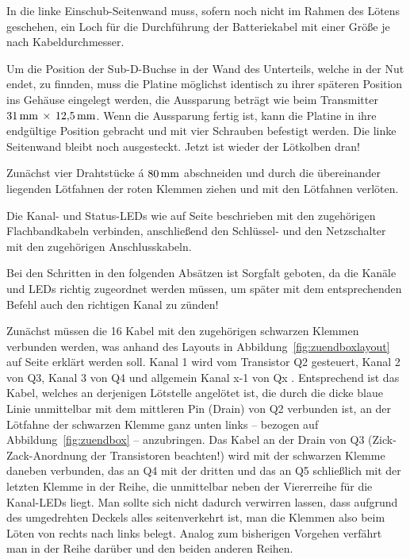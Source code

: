 \documentclass[pdftex, parskip, numbers=noenddot, toc=listof]{scrbook}
\begin{document}
	In die linke Einschub-Seitenwand muss, sofern noch nicht im Rahmen des Lötens geschehen, ein Loch für die Durchführung der Batteriekabel mit einer Größe je nach Kabeldurchmesser.

	Um die Position der Sub-D-Buchse in der Wand des Unterteils, welche in der Nut endet, zu finnden, muss die Platine möglichst identisch zu ihrer späteren Position ins Gehäuse eingelegt werden, die Aussparung beträgt wie beim Transmitter $\unit[31]{mm}\,\times\,\unit[12{,}5]{mm}$. Wenn die Aussparung fertig ist, kann die Platine in ihre endgültige Position gebracht und mit vier Schrauben befestigt werden. Die linke Seitenwand bleibt noch ausgesteckt. Jetzt ist wieder der Lötkolben dran!

	Zunächst vier Drahtstücke á $\unit[80]{mm}$ abschneiden und durch die übereinander liegenden Lötfahnen der roten Klemmen ziehen und mit den Lötfahnen verlöten.

	Die Kanal- und Status-LEDs wie auf Seite \pageref{enum:leds} beschrieben mit den zugehörigen Flachbandkabeln verbinden, anschließend den Schlüssel- und den Netzschalter mit den zugehörigen Anschlusskabeln.

	Bei den Schritten in den folgenden Absätzen ist Sorgfalt geboten, da die Kanäle und LEDs richtig zugeordnet werden müssen, um später mit dem entsprechenden Befehl auch den richtigen Kanal zu zünden!

	Zunächst müssen die 16 Kabel mit den zugehörigen schwarzen Klemmen verbunden werden, was anhand des Layouts in Abbildung~\ref{fig:zuendboxlayout} auf Seite \pageref{fig:zuendboxlayout} erklärt werden soll. Kanal 1 wird vom Transistor Q2 gesteuert, Kanal 2 von Q3, Kanal 3 von Q4 und allgemein Kanal x-1 von Qx . Entsprechend ist das Kabel, welches an derjenigen Lötstelle angelötet ist, die durch die dicke blaue Linie unmittelbar mit dem mittleren Pin (Drain) von Q2 verbunden ist, an der Lötfahne der schwarzen Klemme ganz unten links -- bezogen auf Abbildung~\ref{fig:zuendbox} -- anzubringen. Das Kabel an der Drain von Q3 (Zick-Zack-Anordnung der Transistoren beachten!) wird mit der schwarzen Klemme daneben verbunden, das an Q4 mit der dritten und das an Q5 schließlich mit der letzten Klemme in der Reihe, die unmittelbar neben der Viererreihe für die Kanal-LEDs liegt. Man sollte sich nicht dadurch verwirren lassen, dass aufgrund des umgedrehten Deckels alles seitenverkehrt ist, man die Klemmen also beim Löten von rechts nach links belegt. Analog zum bisherigen Vorgehen verfährt man in der Reihe darüber und den beiden anderen Reihen.
\end{document}
